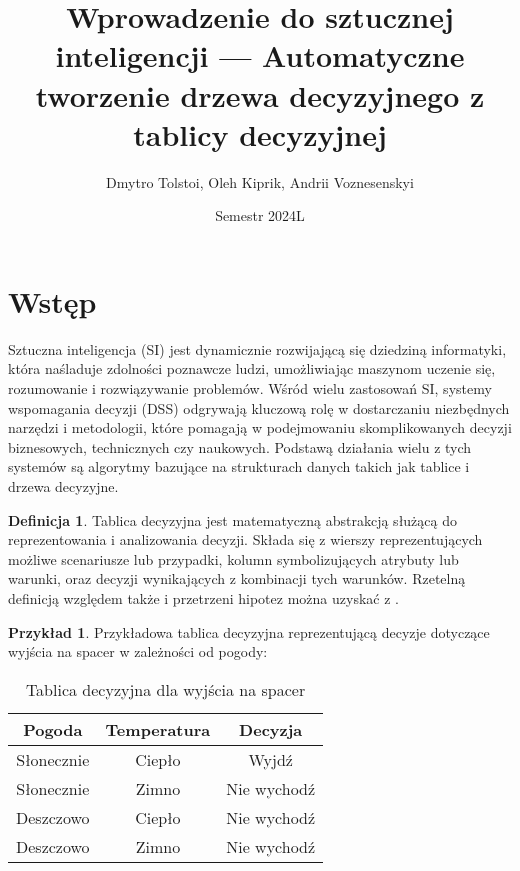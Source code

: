 \documentclass[12pt]{article}
\title{ Wprowadzenie do sztucznej inteligencji --- Automatyczne tworzenie drzewa decyzyjnego z tablicy decyzyjnej }
\author{Dmytro Tolstoi, Oleh Kiprik, Andrii Voznesenskyi}
\date{Semestr 2024L}
\theoremstyle{definition}
\newtheorem{definition}{Definicja}[section]
\theoremstyle{definition}
\newtheorem{example}{Przykład}[section]
\begin{document}
\maketitle
\newpage

\setcounter{section}{0}
\section{Wstęp}

Sztuczna inteligencja (SI) jest dynamicznie rozwijającą się dziedziną informatyki, która naśladuje zdolności poznawcze ludzi, umożliwiając maszynom uczenie się, rozumowanie i rozwiązywanie problemów. Wśród wielu zastosowań SI, systemy wspomagania decyzji (DSS) odgrywają kluczową rolę w dostarczaniu niezbędnych narzędzi i metodologii, które pomagają w podejmowaniu skomplikowanych decyzji biznesowych, technicznych czy naukowych. Podstawą działania wielu z tych systemów są algorytmy bazujące na strukturach danych takich jak tablice i drzewa decyzyjne.

\begin{definition}
Tablica decyzyjna jest matematyczną abstrakcją służącą do reprezentowania i analizowania decyzji. Składa się z wierszy reprezentujących możliwe scenariusze lub przypadki, kolumn symbolizujących atrybuty lub warunki, oraz decyzji wynikających z kombinacji tych warunków. Rzetelną definicją względem także i przetrzeni hipotez można uzyskać z \cite{kohavi1995power}.
\end{definition}

\begin{example}
    
Przykładowa tablica decyzyjna reprezentującą decyzje dotyczące wyjścia na spacer w zależności od pogody:

\begin{table}[h]
\centering
\begin{tabular}{|c|c|c|}
\hline
Pogoda & Temperatura & Decyzja \\
\hline
Słonecznie & Ciepło & Wyjdź \\
Słonecznie & Zimno & Nie wychodź \\
Deszczowo & Ciepło & Nie wychodź \\
Deszczowo & Zimno & Nie wychodź \\
\hline
\end{tabular}
\caption{Tablica decyzyjna dla wyjścia na spacer}
\end{table}

\end{example}
\end{document}
